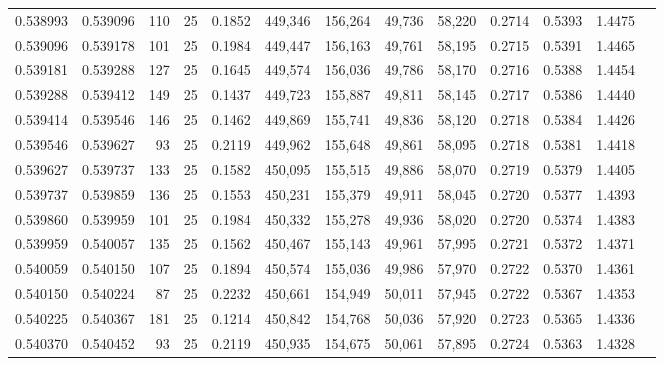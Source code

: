 \begin{tabular}{rrrrrrrrrrrrr}
0.538993 & 0.539096 &   110 &  25 &                                     0.1852 & 449,346 & 156,264 &  49,736 &  58,220 & 0.2714 & 0.5393 & 1.4475 \\
0.539096 & 0.539178 &   101 &  25 &                                     0.1984 & 449,447 & 156,163 &  49,761 &  58,195 & 0.2715 & 0.5391 & 1.4465 \\
0.539181 & 0.539288 &   127 &  25 &                                     0.1645 & 449,574 & 156,036 &  49,786 &  58,170 & 0.2716 & 0.5388 & 1.4454 \\
0.539288 & 0.539412 &   149 &  25 &                                     0.1437 & 449,723 & 155,887 &  49,811 &  58,145 & 0.2717 & 0.5386 & 1.4440 \\
0.539414 & 0.539546 &   146 &  25 &                                     0.1462 & 449,869 & 155,741 &  49,836 &  58,120 & 0.2718 & 0.5384 & 1.4426 \\
0.539546 & 0.539627 &    93 &  25 &                                     0.2119 & 449,962 & 155,648 &  49,861 &  58,095 & 0.2718 & 0.5381 & 1.4418 \\
0.539627 & 0.539737 &   133 &  25 &                                     0.1582 & 450,095 & 155,515 &  49,886 &  58,070 & 0.2719 & 0.5379 & 1.4405 \\
0.539737 & 0.539859 &   136 &  25 &                                     0.1553 & 450,231 & 155,379 &  49,911 &  58,045 & 0.2720 & 0.5377 & 1.4393 \\
0.539860 & 0.539959 &   101 &  25 &                                     0.1984 & 450,332 & 155,278 &  49,936 &  58,020 & 0.2720 & 0.5374 & 1.4383 \\
0.539959 & 0.540057 &   135 &  25 &                                     0.1562 & 450,467 & 155,143 &  49,961 &  57,995 & 0.2721 & 0.5372 & 1.4371 \\
0.540059 & 0.540150 &   107 &  25 &                                     0.1894 & 450,574 & 155,036 &  49,986 &  57,970 & 0.2722 & 0.5370 & 1.4361 \\
0.540150 & 0.540224 &    87 &  25 &                                     0.2232 & 450,661 & 154,949 &  50,011 &  57,945 & 0.2722 & 0.5367 & 1.4353 \\
0.540225 & 0.540367 &   181 &  25 &                                     0.1214 & 450,842 & 154,768 &  50,036 &  57,920 & 0.2723 & 0.5365 & 1.4336 \\
0.540370 & 0.540452 &    93 &  25 &                                     0.2119 & 450,935 & 154,675 &  50,061 &  57,895 & 0.2724 & 0.5363 & 1.4328 \\

\end{tabular}

